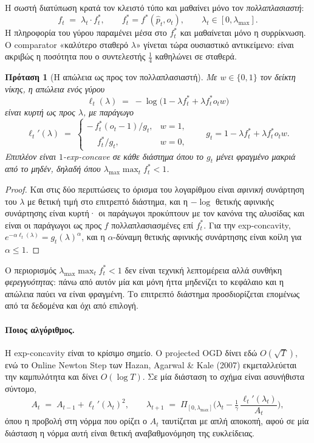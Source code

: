 \documentclass[12pt,a4paper,oneside]{report}
\newcommand{\en}[1]{\textenglish{#1}}
\renewcommand{\_}{\oldunderscore\allowbreak}
\theoremstyle{definition}
\theoremstyle{plain}
\newtheorem{proposition}[theorem]{Πρόταση}
\theoremstyle{remark}
\begin{document}
Η σωστή διατύπωση κρατά τον κλειστό τύπο και μαθαίνει μόνο τον \emph{πολλαπλασιαστή}:
\[
f_t \;=\; \lambda_t \cdot f^{*}_t, \qquad f^{*}_t = f^{*}(\hat{p}_t, o_t),
\qquad \lambda_t \in [0, \lambda_{\max}].
\]
Η πληροφορία του γύρου παραμένει μέσα στο $f^{*}_t$ και μαθαίνεται μόνο η συρρίκνωση. Ο
comparator «καλύτερο σταθερό $\lambda$» γίνεται τώρα ουσιαστικό αντικείμενο: είναι ακριβώς
η ποσότητα που ο συντελεστής $\tfrac14$ καθηλώνει σε σταθερά.

\begin{proposition}[Η απώλεια ως προς τον πολλαπλασιαστή]
\label{prop:oco-kelly}
Με $w \in \{0,1\}$ τον δείκτη νίκης, η απώλεια ενός γύρου
\[
\ell_t(\lambda) \;=\; -\log\big(1 - \lambda f^{*}_t + \lambda f^{*}_t o_t w\big)
\]
είναι κυρτή ως προς $\lambda$, με παράγωγο
\[
\ell_t'(\lambda) \;=\;
\begin{cases}
-\,f^{*}_t (o_t-1) / g_t, & w=1,\\[2pt]
\phantom{-}f^{*}_t / g_t, & w=0,
\end{cases}
\qquad g_t = 1 - \lambda f^{*}_t + \lambda f^{*}_t o_t w .
\]
Επιπλέον είναι $1$-exp-concave σε κάθε διάστημα όπου το $g_t$ μένει φραγμένο μακριά από το
μηδέν, δηλαδή όπου $\lambda_{\max}\max_t f^{*}_t < 1$.
\end{proposition}

\begin{proof}
Και στις δύο περιπτώσεις το όρισμα του λογαρίθμου είναι \emph{αφινική} συνάρτηση του
$\lambda$ με θετική τιμή στο επιτρεπτό διάστημα, και η $-\log$ θετικής αφινικής συνάρτησης
είναι κυρτή· οι παράγωγοι προκύπτουν με τον κανόνα της αλυσίδας και είναι οι παράγωγοι ως
προς $f$ πολλαπλασιασμένες επί $f^{*}_t$. Για την exp-concavity,
$e^{-\alpha \ell_t(\lambda)} = g_t(\lambda)^{\alpha}$, και η $\alpha$-δύναμη θετικής
αφινικής συνάρτησης είναι κοίλη για $\alpha \leq 1$.
\end{proof}

Ο περιορισμός $\lambda_{\max}\max_t f^{*}_t < 1$ δεν είναι τεχνική λεπτομέρεια αλλά συνθήκη
\emph{φερεγγυότητας}: πάνω από αυτόν μία και μόνη ήττα μηδενίζει το κεφάλαιο και η απώλεια
παύει να είναι φραγμένη. Το επιτρεπτό διάστημα προσδιορίζεται επομένως από τα δεδομένα και
όχι από επιλογή.

\paragraph{Ποιος αλγόριθμος.} Η exp-concavity είναι το κρίσιμο σημείο. Ο projected OGD δίνει
εδώ $O(\sqrt{T})$, ενώ το \en{Online Newton Step} των Hazan, Agarwal \& Kale (2007)
εκμεταλλεύεται την καμπυλότητα και δίνει $O(\log T)$. Σε μία διάσταση το σχήμα είναι
ασυνήθιστα σύντομο,
\[
A_t \;=\; A_{t-1} + \ell_t'(\lambda_t)^2, \qquad
\lambda_{t+1} \;=\; \Pi_{[0,\lambda_{\max}]}\Big(\lambda_t - \tfrac{1}{\gamma}\,
\frac{\ell_t'(\lambda_t)}{A_t}\Big),
\]
όπου η προβολή στη νόρμα που ορίζει ο $A_t$ ταυτίζεται με απλή αποκοπή, αφού σε μία διάσταση
η νόρμα αυτή είναι θετική αναβαθμονόμηση της ευκλείδειας.
\end{document}
